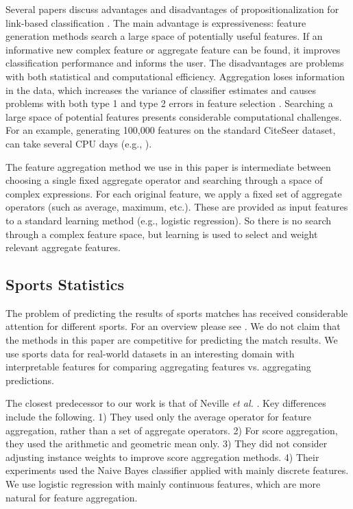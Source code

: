 \documentclass[conference]{IEEEtran}
\begin{document}
Several papers discuss advantages and disadvantages of  propositionalization for link-based classification \cite{DavidJensen2002,han2009}.
The main advantage is expressiveness: feature generation methods search a large space of potentially useful features. If an informative new complex feature or aggregate feature can be found, it improves classification performance and informs the user. The disadvantages are problems with both statistical and computational efficiency. Aggregation loses information in the data, which increases the variance of classifier estimates and causes problems with both type 1 and type 2 errors in feature selection \cite{DavidJensen2002}. Searching a large space of potential features presents considerable computational challenges. For an example, generating 100,000 features on the standard CiteSeer dataset, can take several CPU days (e.g., \cite[Ch.16.1.2]{Popescul2007}).

The feature aggregation method we use in this paper is intermediate between choosing a single fixed aggregate operator and searching through a space of complex expressions. For each original %
feature, we apply a fixed set of aggregate operators (such as average, maximum, etc.). These are provided as input features to a standard learning method (e.g., logistic regression). So there is no search through a complex feature space, but learning is used to select and weight relevant aggregate features.



\subsection{Sports Statistics} The problem of predicting the results of sports matches has received considerable attention for different sports. For an overview please see \cite{Schumaker2010}. We do not claim that the methods in this paper are competitive for predicting the match results.
We use sports data for real-world datasets in an interesting domain with interpretable features for comparing aggregating features vs. aggregating predictions.

The closest predecessor to our work is that of Neville {\em et al.} \cite{Neville2003}. Key differences include the following. 1) They used only the average operator for feature aggregation, rather than a set of aggregate operators. 2)  For score aggregation, they used the arithmetic and geometric mean only. 3) They did not consider adjusting instance weights to improve score aggregation methods. 4) Their experiments used the Naive Bayes classifier applied with mainly discrete features. We use logistic regression with mainly continuous features, which are more natural for feature aggregation.
\end{document}
